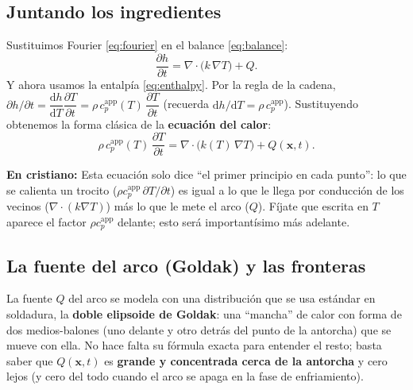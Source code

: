 \documentclass[11pt]{article}
\newcommand{\dd}{\mathrm{d}}
\newcommand{\grad}{\nabla}
\newcommand{\cpapp}{c_p^{\mathrm{app}}}
\theoremstyle{definition}
\theoremstyle{plain}
\newcommand{\dummies}[1]{%
  \par\smallskip\noindent
  \colorbox{yellow!18}{\parbox{\dimexpr\linewidth-2\fboxsep}{%
  \small\textbf{En cristiano:} #1}}\par\smallskip}
\begin{document}
\subsection{Juntando los ingredientes}

Sustituimos Fourier \eqref{eq:fourier} en el balance \eqref{eq:balance}:
\begin{equation}
  \frac{\partial h}{\partial t} = \grad\!\cdot\!\big(k\,\grad T\big) + Q.
  \label{eq:heath}
\end{equation}
Y ahora usamos la entalpía \eqref{eq:enthalpy}. Por la regla de la cadena,
$\partial h/\partial t = \dfrac{\dd h}{\dd T}\dfrac{\partial T}{\partial t}
= \rho\,\cpapp(T)\,\dfrac{\partial T}{\partial t}$ (recuerda
$\dd h/\dd T = \rho\,\cpapp$). Sustituyendo obtenemos la forma clásica de la
\textbf{ecuación del calor}:
\begin{equation}
  \boxed{\;\rho\,\cpapp(T)\,\frac{\partial T}{\partial t}
    = \grad\!\cdot\!\big(k(T)\,\grad T\big) + Q(\bm x,t).\;}
  \label{eq:heat}
\end{equation}

\dummies{Esta ecuación solo dice ``el primer principio en cada punto'': lo que se
calienta un trocito ($\rho\cpapp\,\partial T/\partial t$) es igual a lo que le llega
por conducción de los vecinos ($\grad\!\cdot\!(k\grad T)$) más lo que le mete el
arco ($Q$). Fíjate que escrita en $T$ aparece el factor $\rho\cpapp$ delante; esto
será importantísimo más adelante.}

\subsection{La fuente del arco (Goldak) y las fronteras}

La fuente $Q$ del arco se modela con una distribución que se usa estándar en
soldadura, la \textbf{doble elipsoide de Goldak}: una ``mancha'' de calor con forma
de dos medios-balones (uno delante y otro detrás del punto de la antorcha) que se
mueve con ella. No hace falta su fórmula exacta para entender el resto; basta saber
que $Q(\bm x,t)$ es \textbf{grande y concentrada cerca de la antorcha} y cero lejos
(y cero del todo cuando el arco se apaga en la fase de enfriamiento).
\end{document}
